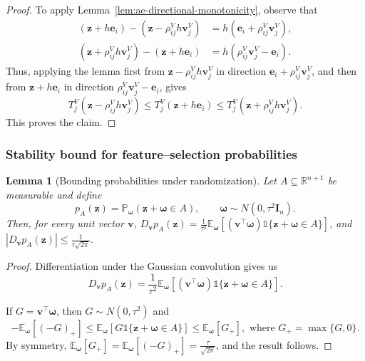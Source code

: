 \documentclass[12pt]{article}
\newtheorem{lemma}{Lemma}
\theoremstyle{definition}
\begin{document}
\begin{proof}
To apply Lemma~\ref{lem:ae-directional-monotonicity}, observe that
\[
\begin{aligned}
    (\boldsymbol z+h\boldsymbol e_i)
    -
    (\boldsymbol z-\rho_{ij}^Vh\boldsymbol v_j^V)
    &=
    h(\boldsymbol e_i+\rho_{ij}^V\boldsymbol v_j^V),\\
    (\boldsymbol z+\rho_{ij}^Vh\boldsymbol v_j^V)
    -
    (\boldsymbol z+h\boldsymbol e_i)
    &=
    h(\rho_{ij}^V\boldsymbol v_j^V-\boldsymbol e_i).
\end{aligned}
\]
Thus, applying the lemma first from
$\boldsymbol z-\rho_{ij}^Vh\boldsymbol v_j^V$ in direction
$\boldsymbol e_i+\rho_{ij}^V\boldsymbol v_j^V$, and then from
$\boldsymbol z+h\boldsymbol e_i$ in direction
$\rho_{ij}^V\boldsymbol v_j^V-\boldsymbol e_i$, gives
\[
    T_j^V(\boldsymbol z-\rho_{ij}^Vh\boldsymbol v_j^V)
    \le
    T_j^V(\boldsymbol z+h\boldsymbol e_i)
    \le
    T_j^V(\boldsymbol z+\rho_{ij}^Vh\boldsymbol v_j^V).
\]
This proves the claim.
\end{proof}


\subsubsection{Stability bound for feature--selection probabilities}

\begin{lemma}[Bounding probabilities under randomization]
\label{lem:gaussian-score-bound}
Let $A\subseteq\mathbb R^{n+1}$ be measurable and define
\[
    p_A(\boldsymbol z)=\mathbb P_{\boldsymbol\omega}(\boldsymbol z+\boldsymbol\omega\in A),
    \qquad
    \boldsymbol\omega\sim N(0,\tau^2\boldsymbol I_n).
\]
Then, for every unit vector $\boldsymbol v$, $D_{\boldsymbol v}p_A(\boldsymbol z)
=\frac1{\tau^2}\mathbb E_{\boldsymbol\omega}\left[ (\boldsymbol v^\top \boldsymbol\omega)\mathds{1}\{\boldsymbol z+\boldsymbol\omega\in A\}\right]$, 
and $|D_{\boldsymbol v}p_A(\boldsymbol z)|\le \frac1{\tau\sqrt{2\pi}}$.
\end{lemma}

\begin{proof}
Differentiation under the Gaussian convolution gives us 
\[D_{\boldsymbol v}p_A(\boldsymbol z)
=\frac1{\tau^2}\mathbb E_{\boldsymbol\omega}\left[ (\boldsymbol v^\top \boldsymbol\omega)\mathds{1}\{\boldsymbol z+\boldsymbol\omega\in A\}\right].
\]

If $G=\boldsymbol v^\top\boldsymbol\omega$, then
$G\sim N(0,\tau^2)$ and
\[
    -\mathbb E_{\boldsymbol\omega}[(-G)_+]
    \le
    \mathbb E_{\boldsymbol\omega}\left[G\mathds{1}\{\boldsymbol z+\boldsymbol\omega\in A\}\right]
    \le
    \mathbb E_{\boldsymbol\omega}[G_+], \text{ where } G_+= \max\{G, 0\}.
\]
By symmetry, $\mathbb E_{\boldsymbol\omega}[G_+]=\mathbb E_{\boldsymbol\omega}[(-G)_+]=\frac{\tau}{\sqrt{2\pi}}$, and the result follows.
\end{proof}
\end{document}
